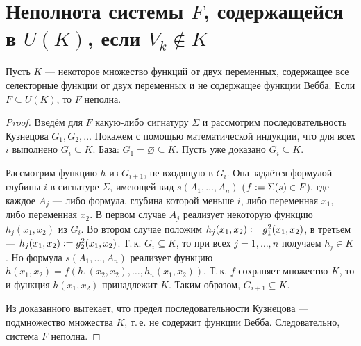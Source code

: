 \section{Неполнота системы $F$, содержащейся в $U(K)$, если $V_k \notin K$}

\begin{lemma}
    Пусть $K$ --- некоторое множество функций от двух переменных, содержащее все селекторные функции от двух переменных и не содержащее функции Вебба. Если $F \subseteq U(K)$, то $F$ неполна.
\end{lemma}

\begin{proof}
    Введём для $F$ какую-либо сигнатуру $\Sigma$ и рассмотрим последовательность Кузнецова $G_1, G_2, \ldots$ Покажем с помощью математической индукции, что для всех $i$ выполнено $G_i \subseteq K$. База: $G_1 = \varnothing \subseteq K$. Пусть уже доказано $G_i \subseteq K$.

    Рассмотрим функцию $h$ из $G_{i + 1}$, не входящую в $G_i$. Она задаётся формулой глубины $i$ в сигнатуре $\Sigma$, имеющей вид $s(A_1, \ldots, A_n)$ ($f \vcentcolon = \Sigma(s) \in F$), где каждое $A_j$ --- либо формула, глубина которой меньше $i$, либо переменная $x_1$, либо переменная $x_2$. В первом случае $A_j$ реализует некоторую функцию $h_j(x_1, x_2)$ из $G_i$. Во втором случае положим $h_j(x_1, x_2) \vcentcolon = g^2_1(x_1, x_2)$, в третьем --- $h_j(x_1, x_2) \vcentcolon = g^2_2(x_1, x_2)$. Т.\,к. $G_i \subseteq K$, то при всех $j = 1, \ldots, n$ получаем $h_j \in K$. Но формула $s(A_1, \ldots, A_n)$ реализует функцию $h(x_1, x_2) = f(h_1(x_2, x_2), \ldots, h_n(x_1, x_2))$. Т.\,к. $f$ сохраняет множество $K$, то и функция $h(x_1, x_2)$ принадлежит $K$. Таким образом, $G_{i + 1} \subseteq K$.

    Из доказанного вытекает, что предел последовательности Кузнецова --- подмножество множества $K$, т.\,е. не содержит функции Вебба. Следовательно, система $F$ неполна.
\end{proof}

